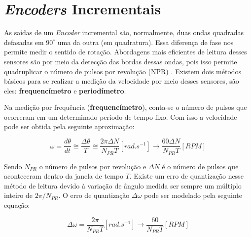 \section{\textit{Encoders} Incrementais}
\label{sec:encoders}


As saídas de um \emph{Encoder} incremental são, normalmente, duas ondas quadradas defasadas em $90^\circ$ uma da outra (em quadratura). Essa diferença de fase nos permite medir o sentido de rotação. Abordagens mais eficientes de leitura desses sensores são por meio da detecção das bordas dessas ondas, pois isso permite quadruplicar o número de pulsos por revolução (NPR) \cite{quantization_error01}. Existem dois métodos básicos para se realizar a medição da velocidade por meio desses sensores, são eles: \textbf{frequencímetro} e \textbf{periodímetro}. 

Na medição por frequência (\textbf{frequencímetro}), conta-se o número de pulsos que ocorreram em um determinado período de tempo fixo. Com isso a velocidade pode ser obtida pela seguinte aproximação:

\begin{equation}
    \omega = \frac{d\theta}{dt} \cong \frac{\Delta{\theta}}{T} \cong \frac{2 \pi \Delta{N}}{N_{PR}T}[rad.s^{-1}] \xrightarrow{} \frac{60 \Delta{N}}{N_{PR} T} [RPM]
\end{equation}

Sendo $N_{PR}$ o número de pulsos por revolução e $\Delta{N}$ é o número de pulsos que aconteceram dentro da janela de tempo $T$. Existe um erro de quantização nesse método de leitura devido à variação de ângulo medida ser sempre um múltiplo inteiro de $ 2\pi/N_{PR}$. O erro de quantização $\Delta{\omega}$ pode ser modelado pela seguinte equação:

\begin{equation}
    \Delta{\omega} = \frac{2\pi}{N_{PR}T}[rad.s^{-1}] \xrightarrow{} \frac{60}{N_{PR}T}[RPM]
    \label{eq:erro_de_quantizacao_frequencimetro}
\end{equation}

